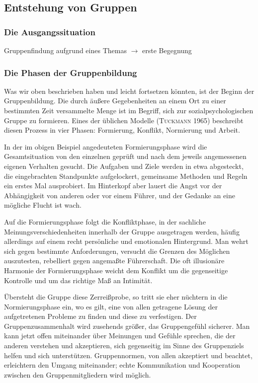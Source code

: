 \documentclass[12pt]{scrartcl}
\begin{document}
\subsection{Entstehung von Gruppen}

\subsubsection{Die Ausgangssituation}
Gruppenfindung aufgrund eines Themas \(\longrightarrow\) erste Begegnung

\subsubsection{Die Phasen der Gruppenbildung}
Was wir oben beschrieben haben und leicht fortsetzen könnten, ist der Beginn
der Gruppenbildung. Die durch äußere Gegebenheiten an einem Ort zu einer
bestimmten Zeit versammelte Menge ist im Begriff, sich zur
sozialpsychologischen Gruppe zu formieren. Eines der üblichen Modelle
(\textsc{Tuckmann} 1965) beschreibt diesen Prozess in vier Phasen: Formierung,
Konflikt, Normierung und Arbeit.

In der im obigen Beispiel angedeuteten Formierungsphase wird die
Gesamtsituation von den einzelnen geprüft und nach dem jeweils angemessenen
eigenen Verhalten gesucht. Die Aufgaben und Ziele werden in etwa abgesteckt,
die eingebrachten Standpunkte aufgelockert, gemeinsame Methoden und Regeln ein
erstes Mal ausprobiert. Im Hinterkopf aber lauert die Angst vor der
Abhängigkeit von anderen oder vor einem Führer, und der Gedanke an eine
mögliche Flucht ist wach.

Auf die Formierungsphase folgt die Konfliktphase, in der sachliche
Meinungsverschiedenheiten innerhalb der Gruppe ausgetragen werden, häufig
allerdings auf einem recht persönliche und emotionalen Hintergrund. Man wehrt
sich gegen bestimmte Anforderungen, versucht die Grenzen des Möglichen
auszutesten, rebelliert gegen angemaßte Führerschaft. Die oft illusionäre
Harmonie der Formierungsphase weicht dem Konflikt um die gegenseitige Kontrolle
und um das richtige Maß an Intimität.

Übersteht die Gruppe diese Zerreißprobe, so tritt sie eher nüchtern in die
Normierungsphase ein, wo es gilt, eine von allen getragene Lösung der
aufgetretenen Probleme zu finden und diese zu verfestigen. Der
Gruppenzusammenhalt wird zusehends größer, das Gruppengefühl sicherer. Man kann
jetzt offen miteinander über Meinungen und Gefühle sprechen, die der anderen
verstehen und akzeptieren, sich gegenseitig im Sinne des Gruppenziels helfen
und sich unterstützen. Gruppennormen, von allen akzeptiert und beachtet,
erleichtern den Umgang miteinander; echte Kommunikation und Kooperation
zwischen den Gruppenmitgliedern wird möglich.
\end{document}
